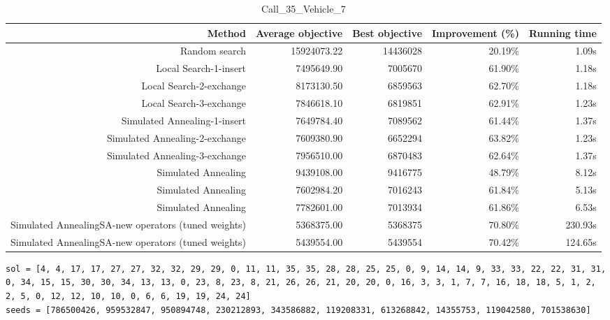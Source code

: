 \begin{table}[ht]
\centering
\caption{Call\_35\_Vehicle\_7}
\label{tab:call35vehicle7}
\begin{tabular}{|r|r|r|r|r|}
Method & Average objective & Best objective & Improvement (\%) & Running time \\
\hline
Random search & 15924073.22 & 14436028 & 20.19\% & 1.09s\\
Local Search-1-insert & 7495649.90 & 7005670 & 61.90\% & 1.18s\\
Local Search-2-exchange & 8173130.50 & 6859563 & 62.70\% & 1.18s\\
Local Search-3-exchange & 7846618.10 & 6819851 & 62.91\% & 1.23s\\
Simulated Annealing-1-insert & 7649784.40 & 7089562 & 61.44\% & 1.37s\\
Simulated Annealing-2-exchange & 7609380.90 & 6652294 & 63.82\% & 1.23s\\
Simulated Annealing-3-exchange & 7956510.00 & 6870483 & 62.64\% & 1.37s\\
Simulated Annealing & 9439108.00 & 9416775 & 48.79\% & 8.12s\\
Simulated Annealing & 7602984.20 & 7016243 & 61.84\% & 5.13s\\
Simulated Annealing & 7782601.00 & 7013934 & 61.86\% & 6.53s\\
Simulated AnnealingSA-new operators (tuned weights) & 5368375.00 & 5368375 & 70.80\% & 230.93s\\
Simulated AnnealingSA-new operators (tuned weights) & 5439554.00 & 5439554 & 70.42\% & 124.65s\\
\end{tabular}%
\end{table}
\begin{lstlisting}[label={lst:call35vehicle7},caption=Optimal solution call\_35\_vehicle\_7]
sol = [4, 4, 17, 17, 27, 27, 32, 32, 29, 29, 0, 11, 11, 35, 35, 28, 28, 25, 25, 0, 9, 14, 14, 9, 33, 33, 22, 22, 31, 31, 0, 34, 15, 15, 30, 30, 34, 13, 13, 0, 23, 8, 23, 8, 21, 26, 26, 21, 20, 20, 0, 16, 3, 3, 1, 7, 7, 16, 18, 18, 5, 1, 2, 2, 5, 0, 12, 12, 10, 10, 0, 6, 6, 19, 19, 24, 24]
seeds = [786500426, 959532847, 950894748, 230212893, 343586882, 119208331, 613268842, 14355753, 119042580, 701538630]
\end{lstlisting}%
\clearpage



